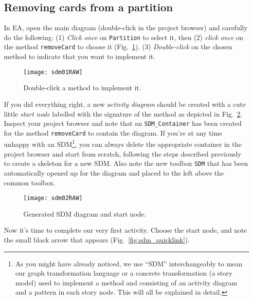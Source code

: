 \subsection{Removing cards from a partition}

In EA, open the main diagram (double-click in the project browser) and carefully do the following: (1) \emph{Click once} on \texttt{Partition} to select it,
then (2) \emph{click once} on the method \texttt{removeCard} to choose it (Fig.~\ref{fig:sdm_start}).   (3) \emph{Double-click} on the
chosen method to indicate that you want to implement it.

\begin{figure}[htp]
\begin{center}
  \texttt{[image: sdm01RAW]}
  \caption{Double-click a method to implement it.}  
  \label{fig:sdm_start}
\end{center}
\end{figure}
 
If you did everything right, a new \emph{activity diagram} should be created  with a cute little \emph{start node} labelled with the
signature of the method  as depicted in Fig.~\ref{fig:sdm_skeleton}.  Inspect your project browser and note that an \texttt{SDM\_Container} has
been created for the method \texttt{removeCard} to contain the diagram.
If you're at any time unhappy with an SDM\footnote{As you might have already noticed, we use ``SDM'' interchangeably to mean our graph transformation language
or a concrete transformation (a story model) used to implement a method and consisting of an activity diagram and a pattern in each story node.
This will all be explained in detail.}, you can always delete the appropriate container in the project browser and start from scratch, following the steps
described previously to create a skeleton for a new SDM.
Also note the new  toolbox \texttt{SDM} that has been automatically opened up for the diagram and placed to the left above the common toolbox.

\begin{figure}[htp]
\begin{center}
  \texttt{[image: sdm02RAW]}
  \caption{Generated SDM diagram and start node.}  
  \label{fig:sdm_skeleton}
\end{center}
\end{figure}

Now it's time to complete our very first activity.
Choose the start node, and note the small black arrow that appears (Fig.~\ref{fig:sdm_quicklink}).

